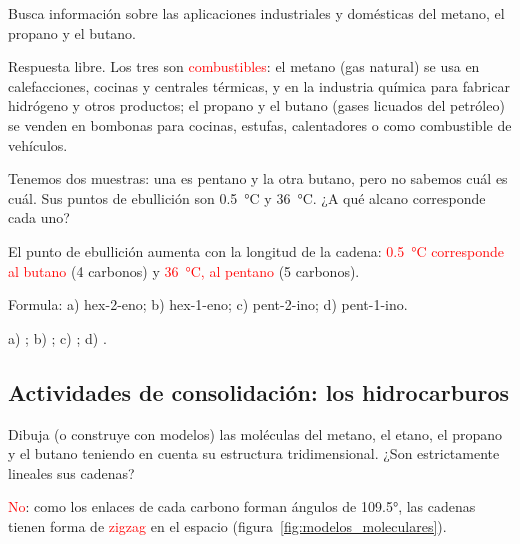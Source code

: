 \begin{exercise}
    Busca información sobre las aplicaciones industriales y domésticas del metano, el propano y el butano.
    \begin{solu}
        Respuesta libre. Los tres son \textcolor{red}{combustibles}: el metano (gas natural) se usa en calefacciones, cocinas y centrales térmicas, y en la industria química para fabricar hidrógeno y otros productos; el propano y el butano (gases licuados del petróleo) se venden en bombonas para cocinas, estufas, calentadores o como combustible de vehículos.
    \end{solu}
\end{exercise}

\begin{exercise}
    Tenemos dos muestras: una es pentano y la otra butano, pero no sabemos cuál es cuál. Sus puntos de ebullición son \qty{0.5}{\degreeCelsius} y \qty{36}{\degreeCelsius}. ¿A qué alcano corresponde cada uno?
    \begin{solu}
        El punto de ebullición aumenta con la longitud de la cadena: \textcolor{red}{\qty{0.5}{\degreeCelsius} corresponde al butano} (4 carbonos) y \textcolor{red}{\qty{36}{\degreeCelsius}, al pentano} (5 carbonos).
    \end{solu}
\end{exercise}

\begin{exercise}
    Formula: a) hex-2-eno; b) hex-1-eno; c) pent-2-ino; d) pent-1-ino.
    \begin{solu}
        a) \textcolor{red}{}; b) \textcolor{red}{};
        c) \textcolor{red}{}; d) \textcolor{red}{}.
    \end{solu}
\end{exercise}

\subsection*{Actividades de consolidación: los hidrocarburos}

\begin{exercise}
    Dibuja (o construye con modelos) las moléculas del metano, el etano, el propano y el butano teniendo en cuenta su estructura tridimensional. ¿Son estrictamente lineales sus cadenas?
    \begin{solu}
        \textcolor{red}{No}: como los enlaces de cada carbono forman ángulos de \ang{109.5}, las cadenas tienen forma de \textcolor{red}{zigzag} en el espacio (figura~\ref{fig:modelos_moleculares}).
    \end{solu}
\end{exercise}

